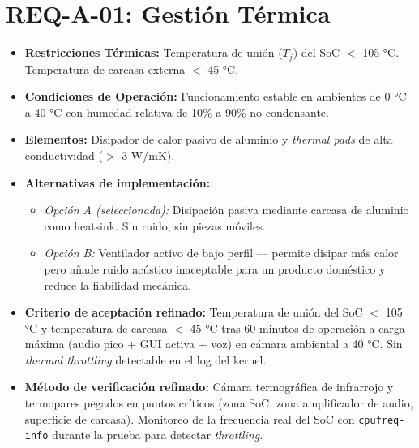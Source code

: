 \documentclass[%
	paper=a4,
	twoside=false,
	parskip=half,
	chapterprefix=false,
	10pt,
	headings=normal,
	bibliography=totoc,
	listof=totoc,
	titlepage=on,
	captions=tableabove,
	draft=false, 
]{scrbook}%
\begin{document}
\section{REQ-A-01: Gestión Térmica}
\begin{itemize}
    \item \textbf{Restricciones Térmicas:} Temperatura de unión ($T_j$) del SoC $<$ 105 °C. Temperatura de carcasa externa $<$ 45 °C.
    \item \textbf{Condiciones de Operación:} Funcionamiento estable en ambientes de 0 °C a 40 °C con humedad relativa de 10\% a 90\% no condensante.
    \item \textbf{Elementos:} Disipador de calor pasivo de aluminio y \textit{thermal pads} de alta conductividad ($>$ 3 W/mK).
    \item \textbf{Alternativas de implementación:}
        \begin{itemize}
            \item \textit{Opción A (seleccionada):} Disipación pasiva mediante carcasa de aluminio como heatsink. Sin ruido, sin piezas móviles.
            \item \textit{Opción B:} Ventilador activo de bajo perfil — permite disipar más calor pero añade ruido acústico inaceptable para un producto doméstico y reduce la fiabilidad mecánica.
        \end{itemize}
    \item \textbf{Criterio de aceptación refinado:} Temperatura de unión del SoC $<$ 105 °C y temperatura de carcasa $<$ 45 °C tras 60 minutos de operación a carga máxima (audio pico + GUI activa + voz) en cámara ambiental a 40 °C. Sin \textit{thermal throttling} detectable en el log del kernel.
    \item \textbf{Método de verificación refinado:} Cámara termográfica de infrarrojo y termopares pegados en puntos críticos (zona SoC, zona amplificador de audio, superficie de carcasa). Monitoreo de la frecuencia real del SoC con \texttt{cpufreq-info} durante la prueba para detectar \textit{throttling}.
\end{itemize}

\end{document}
